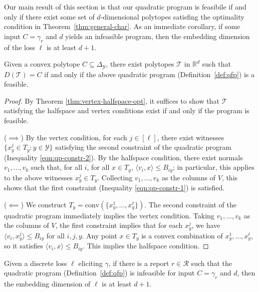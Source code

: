 \documentclass[anon]{colt2020} %
\newcommand{\reals}{\mathbb{R}}
\newcommand{\simplex}{\Delta_\Y}
\newcommand{\R}{\mathcal{R}}
\newcommand{\T}{\mathcal{T}}
\newcommand{\Y}{\mathcal{Y}}
\newcommand{\inprod}[2]{\langle #1, #2 \rangle}%
\newcommand{\conv}{\mathrm{conv}}
\DeclareMathOperator*{\argmin}{arg\,min}
\begin{document}
Our main result of this section is that our quadratic program is feasibile if and only if there exist some set of $d$-dimensional polytopes satisfing the optimality condition in Theorem~\ref{thm:general-char}.
As an immediate corollary, if some input $C=\gamma_r$ and $d$ yields an infeasible program, then the embedding dimension of the loss $\ell$ is at least $d+1$.
\begin{theorem} \label{thm:opt-iff-qfp}
  Given a convex polytope $C \subseteq \simplex$, there exist polytopes $\T$ in $\reals^d$ such that $D(\T) = C$ if and only if the above quadratic program (Definition~\ref{def:qfp}) is a feasible.
\end{theorem}
\begin{proof}
    By Theorem \ref{thm:vertex-halfspace-opt}, it suffices to show that $\T$ satisfying the halfspace and vertex conditions exist if and only if the program is feasible.

  ($\implies$)
  By the vertex condition, for each $j \in [\ell]$, there exist witnesses $\{x^j_y \in T_y : y \in \Y\}$ satisfying the second constraint of the quadratic program (Inequality \ref{eqn:qp-constr-2}).
  By the halfspace condition, there exist normals $v_1, \dots, v_k$ such that, for all $i$, for all $x \in T_y$, $\inprod{v_i}{x} \leq B_{iy}$; in particular, this applies to the above witnesses $x^j_y \in T_y$.
  Collecting $v_1,\dots,v_k$ as the columns of $V$, this shows that the first constraint (Inequality \ref{eqn:qp-constr-1}) is satisfied.

  ($\impliedby$)
  We construct $T_y = \conv(\{x^1_y, \ldots, x^{\ell}_y\})$.
  The second constraint of the quadratic program immediately implies the vertex condition.
  Taking $v_1,\dots,v_k$ as the columns of $V$, the first constraint implies that for each $x^j_y$, we have $\inprod{v_i}{x^j_y} \leq B_{iy}$ for all $i,j,y$.
  Any point $x \in T_y$ is a convex combination of $x^1_y,\ldots,x^{\ell}_y$, so it satisfies $\inprod{v_i}{x} \leq B_{iy}$.
  This implies the halfspace condition.  %
\end{proof}

\begin{corollary}\label{cor:d-embeddable-char}
  Given a discrete loss $\ell$ eliciting $\gamma$, if there is a report $r\in\R$ such that the quadratic program (Definition~\ref{def:qfp}) is infeasible for input $C = \gamma_r$ and $d$, then the embedding dimension of $\ell$ is at least $d+1$.
\end{corollary}
\end{document}

